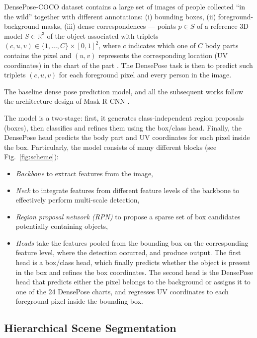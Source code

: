 DensePose-COCO dataset contains a large set of images of people collected ``in the wild'' together with different annotations: (i) bounding boxes, (ii) foreground-background masks, (iii) dense correspondences --- points $p \in S$ of a reference 3D model $S\in\mathbb{R}^3$ of the object associated with triplets $(c, u, v) \in\{1, \ldots, C\} \times[0,1]^{2}$, where $c$ indicates which one of $C$ body parts contains the pixel and $(u,v)$ represents the corresponding location (UV coordinates) in the chart of the part \cite{smpl}.
The DensePose task is then to predict such triplets $(c, u, v)$ for each foreground pixel and every person in the image.

The baseline dense pose prediction model, and all the subsequent works \cite{parsing, uncertainty, monkeys} follow the architecture design of Mask R-CNN \cite{maskrcnn}.

The model is a two-stage: first, it generates class-independent region proposals (boxes), then classifies and refines them using the box/class head. Finally, the DensePose head predicts the body part and UV coordinates for each pixel inside the box. Particularly, the model consists of many different blocks (see Fig.~\ref{fig:scheme}):
\begin{itemize}
    \item \textit{Backbone} to extract features from the image,
    \item \textit{Neck} to integrate features from different feature levels of the backbone to effectively perform multi-scale detection,
    \item \textit{Region proposal network (RPN)} to propose a sparse set of box candidates potentially containing objects,
    \item \textit{Heads} take the features pooled from the bounding box on the corresponding feature level, where the detection occurred, and produce output. The first head is a box/class head, which finally predicts whether the object is present in the box and refines the box coordinates. The second head is the DensePose head that predicts either the pixel belongs to the background or assigns it to one of the 24 DensePose charts, and regresses UV coordinates to each foreground pixel inside the bounding box.
\end{itemize}

\subsection{Hierarchical Scene Segmentation}

